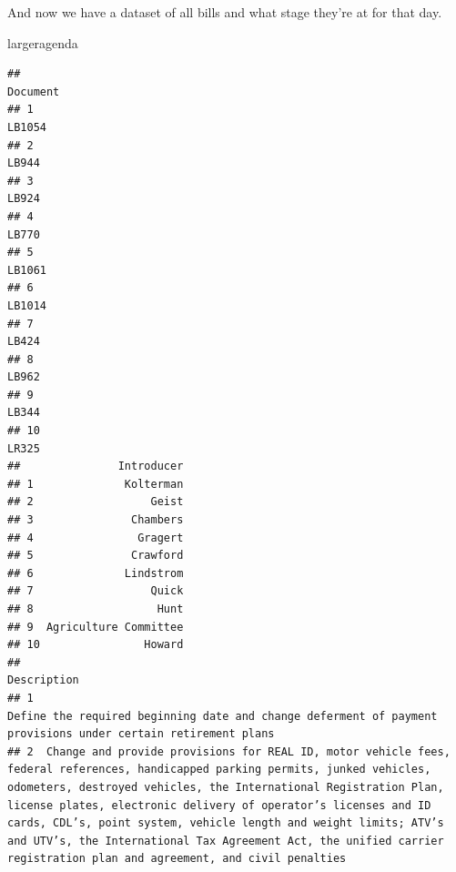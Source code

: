 \documentclass[]{book}
\newenvironment{Shaded}{\begin{snugshade}}{\end{snugshade}}
\newcommand{\NormalTok}[1]{#1}
\begin{document}
And now we have a dataset of all bills and what stage they're at for that day.

\begin{Shaded}
\begin{Highlighting}[]
\NormalTok{largeragenda}
\end{Highlighting}
\end{Shaded}

\begin{verbatim}
##                                                                 Document
## 1                                                                 LB1054
## 2                                                                  LB944
## 3                                                                  LB924
## 4                                                                  LB770
## 5                                                                 LB1061
## 6                                                                 LB1014
## 7                                                                  LB424
## 8                                                                  LB962
## 9                                                                  LB344
## 10                                                                 LR325
##               Introducer
## 1              Kolterman
## 2                  Geist
## 3               Chambers
## 4                Gragert
## 5               Crawford
## 6              Lindstrom
## 7                  Quick
## 8                   Hunt
## 9  Agriculture Committee
## 10                Howard
##                                                                                                                                                                                                                                                                                                                                                                                                                                                            Description
## 1                                                                                                                                                                                                                                                                                                                                                         Define the required beginning date and change deferment of payment provisions under certain retirement plans
## 2  Change and provide provisions for REAL ID, motor vehicle fees, federal references, handicapped parking permits, junked vehicles, odometers, destroyed vehicles, the International Registration Plan, license plates, electronic delivery of operator’s licenses and ID cards, CDL’s, point system, vehicle length and weight limits; ATV’s and UTV’s, the International Tax Agreement Act, the unified carrier registration plan and agreement, and civil penalties

\end{verbatim}
\end{document}
